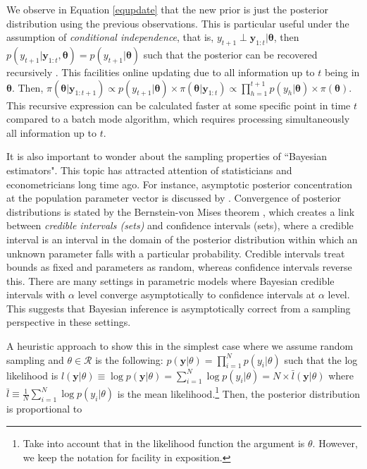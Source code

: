 We observe in Equation \ref{equpdate} that the new prior is just the posterior distribution using the previous observations. This is particular useful under the assumption of \textit{conditional independence}, that is, $y_{t+1}\perp\mathbf{y}_{1:t}|\bm{\theta}$, then $p(y_{t+1}|\mathbf{y}_{1:t},\bm{\theta})=p(y_{t+1}|\bm{\theta})$ such that the posterior can be recovered recursively \cite{petris2009dynamic}. This facilities online updating due to all information up to $t$ being in $\bm{\theta}$. Then, $\pi(\bm{\theta}|\mathbf{y}_{1:t+1})\propto p(y_{t+1}|\bm{\theta})\times \pi(\bm{\theta}|\mathbf{y}_{1:t})\propto\prod_{h=1}^{t+1} p(y_h|\bm{\theta})\times \pi(\bm{\theta})$. This recursive expression can be calculated faster at some specific point in time $t$ compared to a batch mode algorithm, which requires processing simultaneously all information up to $t$.

It is also important to wonder about the sampling properties of ``Bayesian estimators". This topic has attracted attention of statisticians and econometricians long time ago. For instance, asymptotic posterior concentration at the population parameter vector is discussed by \cite{bickel1969some}. Convergence of posterior distributions is stated by the Bernstein-von Mises theorem \cite{Lehmann2003,van2000asymptotic}, which creates a link between \textit{credible intervals (sets)} and confidence intervals (sets), where a credible interval is an interval in the domain of the posterior distribution within which an unknown parameter falls with a particular probability. Credible intervals treat bounds as fixed and parameters as random, whereas confidence intervals reverse this. There are many settings in parametric models where Bayesian credible intervals with $\alpha$ level converge asymptotically to confidence intervals at $\alpha$ level. This suggests that Bayesian inference is asymptotically correct from a sampling perspective in these settings.

A heuristic approach to show this in the simplest case where we assume random sampling and $\theta\in \mathcal{R}$ is the following: $p(\mathbf{y}|\theta)=\prod_{i=1}^N p(y_i|\theta)$ such that the log likelihood is $l(\mathbf{y}|\theta)\equiv\log p(\mathbf{y}|\theta)=\sum_{i=1}^N \log p(y_i|\theta)=N\times \bar{l}(\mathbf{y}|\theta)$ where $\bar{l}\equiv\frac{1}{N}\sum_{i=1}^N \log p(y_i|\theta)$ is the mean likelihood.\footnote{Take into account that in the likelihood function the argument is $\theta$. However, we keep the notation for facility in exposition.} Then, the posterior distribution is proportional to 

